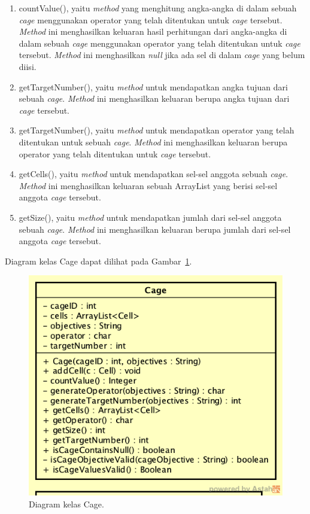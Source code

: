 \begin{enumerate}
\item countValue(), yaitu \textit{method} yang menghitung angka-angka di dalam sebuah \textit{cage} menggunakan operator yang telah ditentukan untuk \textit{cage} tersebut. \textit{Method} ini menghasilkan keluaran hasil perhitungan dari angka-angka di dalam sebuah \textit{cage} menggunakan operator yang telah ditentukan untuk \textit{cage} tersebut. \textit{Method} ini menghasilkan \textit{null} jika ada sel di dalam \textit{cage} yang belum diisi.
\item getTargetNumber(), yaitu \textit{method} untuk mendapatkan angka tujuan dari sebuah \textit{cage}. \textit{Method} ini menghasilkan keluaran berupa angka tujuan dari \textit{cage} tersebut.
\item getTargetNumber(), yaitu \textit{method} untuk mendapatkan operator yang telah ditentukan untuk sebuah \textit{cage}. \textit{Method} ini menghasilkan keluaran berupa operator yang telah ditentukan untuk \textit{cage} tersebut.
\item getCells(), yaitu \textit{method} untuk mendapatkan sel-sel anggota sebuah \textit{cage}. \textit{Method} ini menghasilkan keluaran sebuah ArrayList yang berisi sel-sel anggota \textit{cage} tersebut.
\item getSize(), yaitu \textit{method} untuk mendapatkan jumlah dari sel-sel anggota sebuah \textit{cage}. \textit{Method} ini menghasilkan keluaran berupa jumlah dari sel-sel anggota \textit{cage} tersebut.
\end{enumerate}

Diagram kelas Cage dapat dilihat pada Gambar~\ref{fig:diagramkelascage}.

\begin{figure}
\centering
\captionsetup{justification=centering}
\includegraphics[scale=0.5]{Gambar/Perancangan/DiagramKelasCage.png}
\caption[Diagram kelas Cage.]{Diagram kelas Cage.}
\label{fig:diagramkelascage}
\end{figure}

